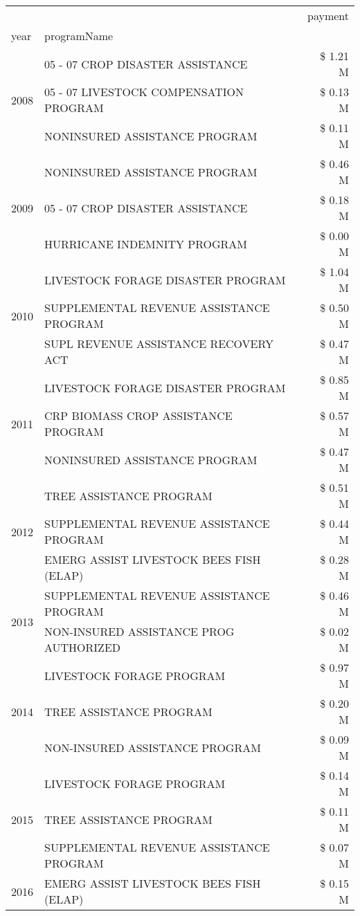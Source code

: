 \begin{tabular}{llr}
\toprule
 &  & payment \\
year & programName &  \\
\midrule
\multirow[t]{3}{*}{2008} & 05 - 07 CROP DISASTER ASSISTANCE & \$ 1.21 M \\
 & 05 - 07 LIVESTOCK COMPENSATION PROGRAM & \$ 0.13 M \\
 & NONINSURED ASSISTANCE PROGRAM & \$ 0.11 M \\
\cline{1-3}
\multirow[t]{3}{*}{2009} & NONINSURED ASSISTANCE PROGRAM & \$ 0.46 M \\
 & 05 - 07 CROP DISASTER ASSISTANCE & \$ 0.18 M \\
 & HURRICANE INDEMNITY PROGRAM & \$ 0.00 M \\
\cline{1-3}
\multirow[t]{3}{*}{2010} & LIVESTOCK FORAGE DISASTER  PROGRAM & \$ 1.04 M \\
 & SUPPLEMENTAL REVENUE ASSISTANCE PROGRAM & \$ 0.50 M \\
 & SUPL REVENUE ASSISTANCE RECOVERY ACT & \$ 0.47 M \\
\cline{1-3}
\multirow[t]{3}{*}{2011} & LIVESTOCK FORAGE DISASTER PROGRAM & \$ 0.85 M \\
 & CRP BIOMASS CROP ASSISTANCE PROGRAM & \$ 0.57 M \\
 & NONINSURED ASSISTANCE PROGRAM & \$ 0.47 M \\
\cline{1-3}
\multirow[t]{3}{*}{2012} & TREE ASSISTANCE PROGRAM & \$ 0.51 M \\
 & SUPPLEMENTAL REVENUE ASSISTANCE PROGRAM & \$ 0.44 M \\
 & EMERG ASSIST LIVESTOCK BEES FISH (ELAP) & \$ 0.28 M \\
\cline{1-3}
\multirow[t]{2}{*}{2013} & SUPPLEMENTAL REVENUE ASSISTANCE PROGRAM & \$ 0.46 M \\
 & NON-INSURED ASSISTANCE PROG AUTHORIZED & \$ 0.02 M \\
\cline{1-3}
\multirow[t]{3}{*}{2014} & LIVESTOCK FORAGE PROGRAM & \$ 0.97 M \\
 & TREE ASSISTANCE PROGRAM & \$ 0.20 M \\
 & NON-INSURED ASSISTANCE PROGRAM & \$ 0.09 M \\
\cline{1-3}
\multirow[t]{3}{*}{2015} & LIVESTOCK FORAGE PROGRAM & \$ 0.14 M \\
 & TREE ASSISTANCE PROGRAM & \$ 0.11 M \\
 & SUPPLEMENTAL REVENUE ASSISTANCE PROGRAM & \$ 0.07 M \\
\cline{1-3}
\multirow[t]{3}{*}{2016} & EMERG ASSIST LIVESTOCK BEES FISH (ELAP)       & \$ 0.15 M \\

\end{tabular}

